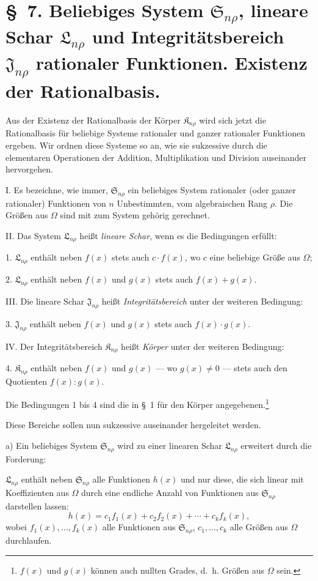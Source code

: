 \documentclass[11pt]{article}
\providecommand{\Kfield}{\mathfrak{K}}
\providecommand{\Ssys}{\mathfrak{S}}
\providecommand{\Jdom}{\mathfrak{J}}
\providecommand{\Lsys}{\mathfrak{L}}
\begin{document}
\section*{\S\ 7. Beliebiges System $\Ssys_{n\rho}$, lineare Schar $\Lsys_{n\rho}$ und Integritätsbereich $\Jdom_{n\rho}$ rationaler Funktionen. Existenz der Rationalbasis.}

Aus der Existenz der Rationalbasis der Körper $\Kfield_{n\rho}$ wird sich jetzt die Rationalbasis für beliebige Systeme rationaler und ganzer rationaler Funktionen ergeben. Wir ordnen diese Systeme so an, wie sie sukzessive durch die elementaren Operationen der Addition, Multiplikation und Division auseinander hervorgehen.

I. Es bezeichne, wie immer, $\Ssys_{n\rho}$ ein beliebiges System rationaler (oder ganzer rationaler) Funktionen von $n$ Unbestimmten, vom algebraischen Rang $\rho$. Die Größen aus $\Omega$ sind mit zum System gehörig gerechnet.

II. Das System $\Lsys_{n\rho}$ heißt \emph{lineare Schar}, wenn es die Bedingungen erfüllt:

1. $\Lsys_{n\rho}$ enthält neben $f(x)$ stets auch $c\cdot f(x)$, wo $c$ eine beliebige Größe aus $\Omega$;

2. $\Lsys_{n\rho}$ enthält neben $f(x)$ und $g(x)$ stets auch $f(x)+g(x)$.

III. Die lineare Schar $\Jdom_{n\rho}$ heißt \emph{Integritätsbereich} unter der weiteren Bedingung:

3. $\Jdom_{n\rho}$ enthält neben $f(x)$ und $g(x)$ stets auch $f(x)\cdot g(x)$.

IV. Der Integritätsbereich $\Kfield_{n\rho}$ heißt \emph{Körper} unter der weiteren Bedingung:

4. $\Kfield_{n\rho}$ enthält neben $f(x)$ und $g(x)$ --- wo $g(x)\ne0$ --- stets auch den Quotienten $f(x):g(x)$.

Die Bedingungen 1 bis 4 sind die in \S\ 1 für den Körper angegebenen.\footnote{$f(x)$ und $g(x)$ können auch nullten Grades, d.~h. Größen aus $\Omega$ sein.}

Diese Bereiche sollen nun sukzessive auseinander hergeleitet werden.

a) Ein beliebiges System $\Ssys_{n\rho}$ wird zu einer linearen Schar $\Lsys_{n\rho}$ erweitert durch die Forderung:

$\Lsys_{n\rho}$ enthält neben $\Ssys_{n\rho}$ alle Funktionen $h(x)$ und nur diese, die sich linear mit Koeffizienten aus $\Omega$ durch eine endliche Anzahl von Funktionen aus $\Ssys_{n\rho}$ darstellen lassen:
\[
  h(x)=c_1f_1(x)+c_2f_2(x)+\cdots+c_kf_k(x),
\]
wobei $f_1(x),\ldots,f_k(x)$ alle Funktionen aus $\Ssys_{n\rho}$, $c_1,
\ldots,c_k$ alle Größen aus $\Omega$ durchlaufen.
\end{document}
